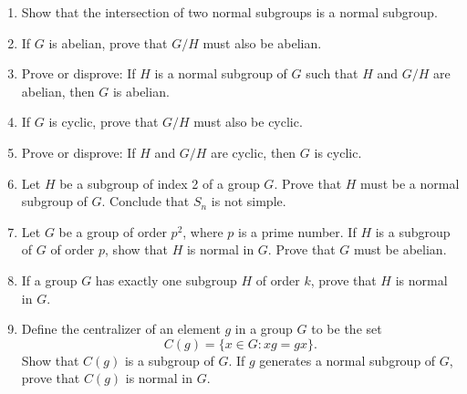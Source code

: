 {\begin{enumerate}
 
\bf\item\rm
Show that the intersection of two normal subgroups is a normal
subgroup. 
 
 
% 
% 
 
 

\bf\item\rm
If $G$ is abelian, prove that $G/H$ must also be abelian.
 
\bf\item\rm
Prove or disprove: If $H$ is a normal subgroup of $G$ such that $H$
and $G/H$ are abelian, then $G$ is abelian. 
 
 

\bf\item\rm
If $G$ is cyclic, prove that $G/H$ must also be cyclic.


\bf\item\rm
Prove or disprove: If $H$ and $G/H$ are cyclic, then $G$ is cyclic.
 
 
\bf\item\rm
Let $H$ be a subgroup of index 2 of a group $G$. Prove that $H$ must
be a normal subgroup of $G$. Conclude that $S_n$ is not simple.
 
 
\bf\item\rm
Let $G$ be a group of order $p^2$, where $p$ is a prime number. If $H$
is a subgroup of $G$ of order $p$, show that $H$ is normal in $G$.
Prove that $G$ must be abelian. 
 
 
\bf\item\rm
If a group $G$ has exactly one subgroup $H$ of order $k$, prove that
$H$ is normal in $G$. 
 
 
% 
 
\bf\item\rm
Define the {\bfi centralizer\/} of an element $g$ in a group $G$
to be the set  
\[
C(g) = \{ x \in G : xg = gx \}.
\]
Show that $C(g)$ is a subgroup of $G$.  If $g$ generates a normal
subgroup of $G$, prove that $C(g)$ is normal in $G$.
 

\end{enumerate}}
